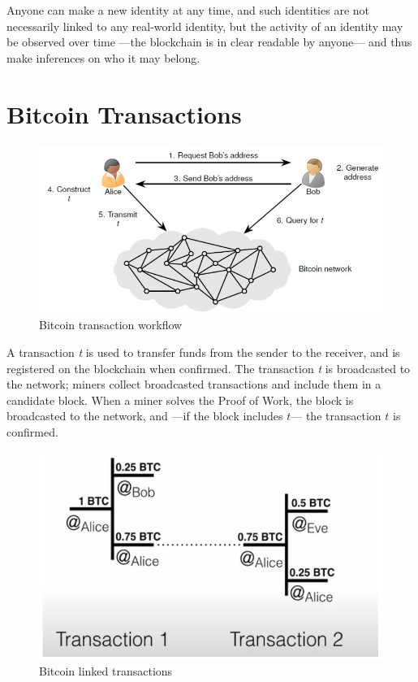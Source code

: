 Anyone can make a new identity at any time, and such identities are not necessarily linked to any real-world identity, but the activity of an identity may be observed over time ---the blockchain is in clear readable by anyone--- and thus make inferences on who it may belong.

\section{Bitcoin Transactions}

\begin{figure}[htbp]
   \centering
   \includegraphics{images/bitcoin_workflow.png}
   \caption{Bitcoin transaction workflow}
   \label{fig:bitcoin_workflow}
\end{figure}

A transaction \textit{t} is used to transfer funds from the sender to the receiver, and is registered on the blockchain when confirmed.
The transaction \textit{t} is broadcasted to the network; miners collect broadcasted transactions and include them in a candidate block.
When a miner solves the Proof of Work, the block is broadcasted to the network, and ---if the block includes $t$--- the transaction $t$ is confirmed.

\begin{figure}[htbp]
   \centering
   \includegraphics{images/bitcoin_transaction.png}
   \caption{Bitcoin linked transactions}
   \label{fig:bitcoin_transaction}
\end{figure}

